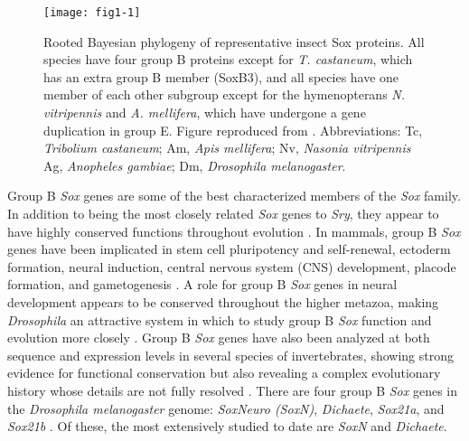\begin{figure}
\centering
\texttt{[image: fig1-1]}
\caption{Rooted Bayesian phylogeny of representative insect Sox proteins. All species have four group B proteins except for \emph{T. castaneum}, which has an extra group B member (SoxB3), and all species have one member of each other subgroup except for the hymenopterans \emph{N. vitripennis} and \emph{A. mellifera}, which have undergone a gene duplication in group E. Figure reproduced from \citet{wilson_evolution_2008}. Abbreviations: Tc, \emph{Tribolium castaneum}; Am, \emph{Apis mellifera}; Nv, \emph{Nasonia vitripennis} Ag, \emph{Anopheles gambiae}; Dm, \emph{Drosophila melanogaster}.}
\label{Figure 1.1}
\end{figure}

Group B \emph{Sox} genes are some of the best characterized members of the \emph{Sox} family. In addition to being the most closely related \emph{Sox} genes to \emph{Sry}, they appear to have highly conserved functions throughout evolution \citep{collignon_comparison_1996,mckimmie_conserved_2005}. In mammals, group B \emph{Sox} genes have been implicated in stem cell pluripotency and self-renewal, ectoderm formation, neural induction, central nervous system (CNS) development, placode formation, and gametogenesis \citep{guth_having_2008}. A role for group B \emph{Sox} genes in neural development appears to be conserved throughout the higher metazoa, making \emph{Drosophila} an attractive system in which to study group B \emph{Sox} function and evolution more closely \citep{uwanogho_embryonic_1995,wood_comparative_1999,wegner_stem_2005}. Group B \emph{Sox} genes have also been analyzed at both sequence and expression levels in several species of invertebrates, showing strong evidence for functional conservation but also revealing a complex evolutionary history whose details are not fully resolved \citep{wilson_evolution_2008,mckimmie_conserved_2005,wei_identification_2010,pioro_expression_2006,zhong_parallel_2011}. There are four group B \emph{Sox} genes in the \emph{Drosophila melanogaster} genome: \emph{SoxNeuro (SoxN)}, \emph{Dichaete}, \emph{Sox21a}, and \emph{Sox21b} \citep{mckimmie_conserved_2005}. Of these, the most extensively studied to date are \emph{SoxN} and \emph{Dichaete}.\\


